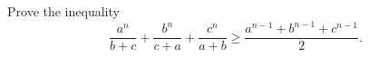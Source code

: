 Prove the inequality
\[ \frac{a^n}{b + c} + \frac{b^n}{c + a} + \frac{c^n}{a + b} \geq \frac{a^{n-1} + b^{n-1} + c^{n-1}}{2}. \]
